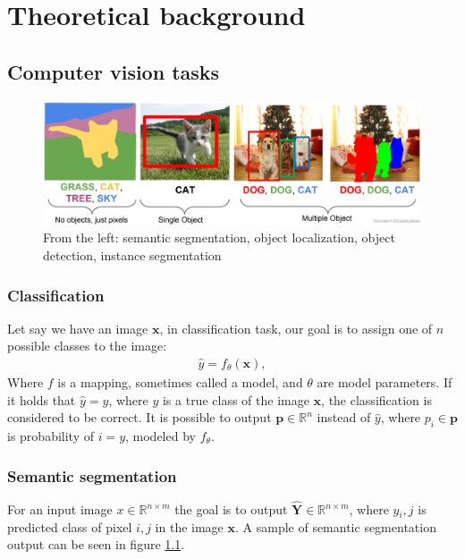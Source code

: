 \chapter{Theoretical background}
\section{Computer vision tasks}
\begin{figure}
    \centering
    \includegraphics[width=\linewidth]{images/computer_vision_tasks.png}
    \caption{From the left: semantic segmentation, object localization, object detection, instance segmentation}
    \label{fig:computer_vision_tasks}
\end{figure}
\subsection{Classification}
Let say we have an image $\mathbf{x}$, in classification task, our goal is to assign one of $n$ possible classes to the image:
\begin{align}
    \hat{y} = f_\theta\left(\mathbf{x} \right),
\end{align}
Where $f$ is a mapping, sometimes called a model, and $\theta$ are model parameters. If it holds that $\hat{y}=y$, where $y$ is a true class of the image $\mathbf{x}$, the classification is considered to be correct.
It is possible to output $\mathbf{p} \in \mathbb{R}^n$ instead of $\hat{y}$, where $p_i \in \mathbf{p}$ is probability of $i = y$, modeled by $f_\theta$.

\subsection{Semantic segmentation}
For an input image $x \in \mathbb{R}^{n \times m}$ the goal is to output $\mathbf{\hat{Y}} \in \mathbb{R}^{n \times m}$, where $y{_i,j}$ is predicted class of pixel $i,j$ in the image $\mathbf{x}$. A sample of semantic segmentation output can be seen in figure \ref{fig:computer_vision_tasks}.

